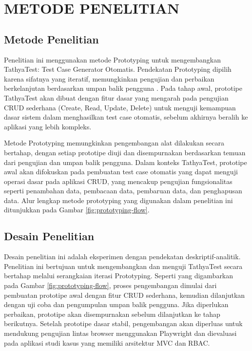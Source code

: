 \chapter{METODE PENELITIAN}\label{bab-iii-metode-penelitian}

\section{Metode Penelitian}\label{metode-penelitian}

Penelitian ini menggunakan metode Prototyping untuk mengembangkan TathyaTest: Test Case Generator Otomatis. Pendekatan Prototyping dipilih karena sifatnya yang iteratif, memungkinkan pengujian dan perbaikan berkelanjutan berdasarkan umpan balik pengguna \parencite{garousi2019greylit}. Pada tahap awal, prototipe TathyaTest akan dibuat dengan fitur dasar yang mengarah pada pengujian CRUD sederhana (Create, Read, Update, Delete) untuk menguji kemampuan dasar sistem dalam menghasilkan test case otomatis, sebelum akhirnya beralih ke aplikasi yang lebih kompleks.

Metode Prototyping memungkinkan pengembangan alat dilakukan secara bertahap, dengan setiap prototipe diuji dan disempurnakan berdasarkan temuan dari pengujian dan umpan balik pengguna. Dalam konteks TathyaTest, prototipe awal akan difokuskan pada pembuatan test case otomatis yang dapat menguji operasi dasar pada aplikasi CRUD, yang mencakup pengujian fungsionalitas seperti penambahan data, pembacaan data, pembaruan data, dan penghapusan data. Alur lengkap metode prototyping yang digunakan dalam penelitian ini ditunjukkan pada Gambar \ref{fig:prototyping-flow}.

\section{Desain Penelitian}\label{desain-penelitian}

Desain penelitian ini adalah eksperimen dengan pendekatan deskriptif-analitik. Penelitian ini bertujuan untuk mengembangkan dan menguji TathyaTest secara bertahap melalui serangkaian iterasi Prototyping. Seperti yang digambarkan pada Gambar \ref{fig:prototyping-flow}, proses pengembangan dimulai dari pembuatan prototipe awal dengan fitur CRUD sederhana, kemudian dilanjutkan dengan uji coba dan pengumpulan umpan balik pengguna. Jika diperlukan perbaikan, prototipe akan disempurnakan sebelum dilanjutkan ke tahap berikutnya. Setelah prototipe dasar stabil, pengembangan akan diperluas untuk mendukung pengujian lintas browser menggunakan Playwright dan dievaluasi pada aplikasi studi kasus yang memiliki arsitektur MVC dan RBAC.

